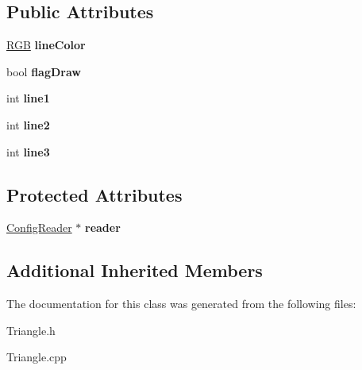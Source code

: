 \subsection*{Public Attributes}
\begin{DoxyCompactItemize}
\item 
\hypertarget{class_triangle_a4242960824476cbd40ac805a36e72f57}{\hyperlink{struct_r_g_b}{R\-G\-B} {\bfseries line\-Color}}\label{class_triangle_a4242960824476cbd40ac805a36e72f57}

\item 
\hypertarget{class_triangle_ac31e045c63aa605bce528ecd33adb441}{bool {\bfseries flag\-Draw}}\label{class_triangle_ac31e045c63aa605bce528ecd33adb441}

\item 
\hypertarget{class_triangle_a42dd14cfba24d9c5402ee74816d8106d}{int {\bfseries line1}}\label{class_triangle_a42dd14cfba24d9c5402ee74816d8106d}

\item 
\hypertarget{class_triangle_a8dcf84b9e6aac04f46b55f09e385aa2e}{int {\bfseries line2}}\label{class_triangle_a8dcf84b9e6aac04f46b55f09e385aa2e}

\item 
\hypertarget{class_triangle_a30c9ca4ec9dbf12564d1ac061e723dfa}{int {\bfseries line3}}\label{class_triangle_a30c9ca4ec9dbf12564d1ac061e723dfa}

\end{DoxyCompactItemize}
\subsection*{Protected Attributes}
\begin{DoxyCompactItemize}
\item 
\hypertarget{class_triangle_a769752209f8ab14cc98f97b3619dea4c}{\hyperlink{class_config_reader}{Config\-Reader} $\ast$ {\bfseries reader}}\label{class_triangle_a769752209f8ab14cc98f97b3619dea4c}

\end{DoxyCompactItemize}
\subsection*{Additional Inherited Members}


The documentation for this class was generated from the following files\-:\begin{DoxyCompactItemize}
\item 
Triangle.\-h\item 
Triangle.\-cpp\end{DoxyCompactItemize}
